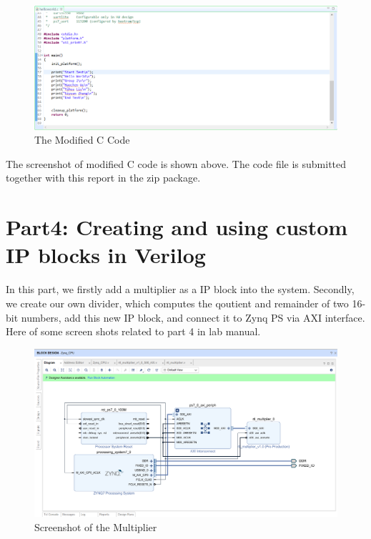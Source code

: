 \documentclass[a4paper]{article}
\begin{document}
\begin{figure}[H]
    \centering
    \includegraphics[width=14cm]{4}
    \caption{The Modified C Code}
    \label{fig:4}
\end{figure}
The screenshot of modified C code is shown above. The code file is submitted together with this report in the zip package.
\section{Part4: Creating and using custom IP blocks in Verilog}
In this part, we firstly add a multiplier as a IP block into the system. Secondly, we create our own divider, which computes the qoutient and remainder of two 16-bit numbers, add this new IP block, and connect it to Zynq PS via AXI interface. Here of some screen shots related to part 4 in lab manual.
\begin{figure}[H]
    \centering
    \includegraphics[width=14cm]{5_new.png}
    \caption{Screenshot of the Multiplier}
    \label{fig:5}
\end{figure}
\end{document}

